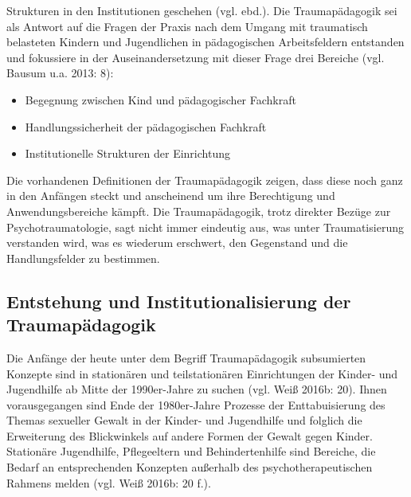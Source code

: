 Strukturen in den Institutionen geschehen (vgl. ebd.). Die Traumapädagogik sei als Antwort auf die Fragen der Praxis nach dem Umgang mit traumatisch belasteten Kindern und Jugendlichen in pädagogischen Arbeitsfeldern entstanden und fokussiere in der Auseinandersetzung mit dieser Frage drei Bereiche (vgl. Bausum u.a. 2013: 8):

\begin{itemize}[noitemsep]
\item Begegnung zwischen Kind und pädagogischer Fachkraft 
\item Handlungssicherheit der pädagogischen Fachkraft 
\item Institutionelle Strukturen der Einrichtung
\end{itemize}

Die vorhandenen Definitionen der Traumapädagogik zeigen, dass diese noch ganz in den Anfängen steckt und anscheinend um ihre Berechtigung und Anwendungsbereiche kämpft. Die Traumapädagogik, trotz direkter Bezüge zur Psychotraumatologie, sagt nicht immer eindeutig aus, was unter Traumatisierung verstanden wird, was es wiederum erschwert, den Gegenstand und die Handlungsfelder zu bestimmen.

\subsection{Entstehung und Institutionalisierung der Traumapädagogik}
Die Anfänge der heute unter dem Begriff Traumapädagogik subsumierten Konzepte sind in stationären und teilstationären Einrichtungen der Kinder- und Jugendhilfe ab Mitte der 1990er-Jahre zu suchen (vgl. Weiß 2016b: 20). Ihnen vorausgegangen sind Ende der 1980er-Jahre Prozesse der Enttabuisierung des Themas sexueller Gewalt in der Kinder- und Jugendhilfe und folglich die Erweiterung des Blickwinkels auf andere Formen der Gewalt gegen Kinder. Stationäre Jugendhilfe, Pflegeeltern und Behindertenhilfe sind Bereiche, die Bedarf an entsprechenden Konzepten außerhalb des psychotherapeutischen Rahmens melden (vgl. Weiß 2016b: 20 f.).


